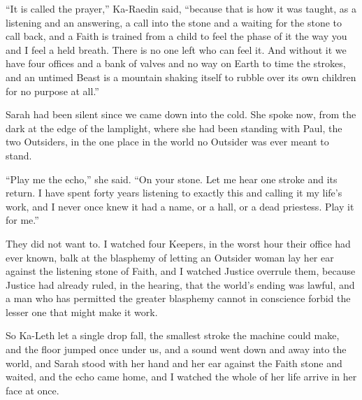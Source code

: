 ``It is called the prayer,'' Ka-Raedin said, ``because that is how it was taught, as a listening and an answering, a call into the stone and a waiting for the stone to call back, and a Faith is trained from a child to feel the phase of it the way you and I feel a held breath. There is no one left who can feel it. And without it we have four offices and a bank of valves and no way on Earth to time the strokes, and an untimed Beast is a mountain shaking itself to rubble over its own children for no purpose at all.''\par

Sarah had been silent since we came down into the cold. She spoke now, from the dark at the edge of the lamplight, where she had been standing with Paul, the two Outsiders, in the one place in the world no Outsider was ever meant to stand.\par

``Play me the echo,'' she said. ``On your stone. Let me hear one stroke and its return. I have spent forty years listening to exactly this and calling it my life's work, and I never once knew it had a name, or a hall, or a dead priestess. Play it for me.''\par

\ornament

They did not want to. I watched four Keepers, in the worst hour their office had ever known, balk at the blasphemy of letting an Outsider woman lay her ear against the listening stone of Faith, and I watched Justice overrule them, because Justice had already ruled, in the hearing, that the world's ending was lawful, and a man who has permitted the greater blasphemy cannot in conscience forbid the lesser one that might make it work.\par

So Ka-Leth let a single drop fall, the smallest stroke the machine could make, and the floor jumped once under us, and a sound went down and away into the world, and Sarah stood with her hand and her ear against the Faith stone and waited, and the echo came home, and I watched the whole of her life arrive in her face at once.\par

